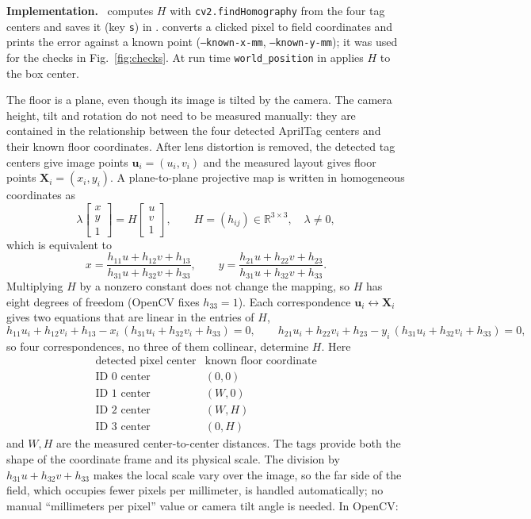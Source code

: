 \documentclass[10pt,a4paper]{article}
\newenvironment{impl}{\par\smallskip\noindent\footnotesize\textbf{Implementation.}\ }{\par\smallskip}
\begin{document}
\begin{impl}
 computes $H$ with
\texttt{cv2.findHomography} from the four tag centers and saves it (key
\texttt{s}) in .
 converts a clicked pixel to field
coordinates and prints the error against a known point
(\texttt{--known-x-mm}, \texttt{--known-y-mm}); it was used for the checks in
Fig.~\ref{fig:checks}.  At run time \texttt{world\_position} in
 applies $H$ to the box center.
\end{impl}

The floor is a plane, even though its image is tilted by the camera.  The
camera height, tilt and rotation do not need to be measured manually: they are
contained in the relationship between the four detected AprilTag centers and
their known floor coordinates.  After lens distortion is removed, the detected
tag centers give image points $\mathbf u_i=(u_i,v_i)$ and the measured layout
gives floor points $\mathbf X_i=(x_i,y_i)$.  A plane-to-plane projective map is
written in homogeneous coordinates as
\[
\lambda\begin{bmatrix}x\\y\\1\end{bmatrix}
= H\begin{bmatrix}u\\v\\1\end{bmatrix},
\qquad H=(h_{ij})\in\mathbb R^{3\times 3},\quad \lambda\neq 0,
\]
which is equivalent to
\[
x=\frac{h_{11}u+h_{12}v+h_{13}}{h_{31}u+h_{32}v+h_{33}},\qquad
y=\frac{h_{21}u+h_{22}v+h_{23}}{h_{31}u+h_{32}v+h_{33}} .
\]
Multiplying $H$ by a nonzero constant does not change the mapping, so $H$ has
eight degrees of freedom (OpenCV fixes $h_{33}=1$).  Each correspondence
$\mathbf u_i\leftrightarrow\mathbf X_i$ gives two equations that are linear in
the entries of $H$,
\[
h_{11}u_i+h_{12}v_i+h_{13}-x_i\,(h_{31}u_i+h_{32}v_i+h_{33})=0,\qquad
h_{21}u_i+h_{22}v_i+h_{23}-y_i\,(h_{31}u_i+h_{32}v_i+h_{33})=0 ,
\]
so four correspondences, no three of them collinear, determine $H$.  Here
\[
\begin{array}{c|c}
\text{detected pixel center} & \text{known floor coordinate}\\
\hline
\text{ID 0 center} & (0,0)\\
\text{ID 1 center} & (W,0)\\
\text{ID 2 center} & (W,H)\\
\text{ID 3 center} & (0,H)
\end{array}
\]
and $W,H$ are the measured center-to-center distances.  The tags provide both
the shape of the coordinate frame and its physical scale.  The division by
$h_{31}u+h_{32}v+h_{33}$ makes the local scale vary over the image, so the
far side of the field, which occupies fewer pixels per millimeter, is handled
automatically; no manual ``millimeters per pixel'' value or camera tilt angle
is needed.  In OpenCV:
\end{document}
